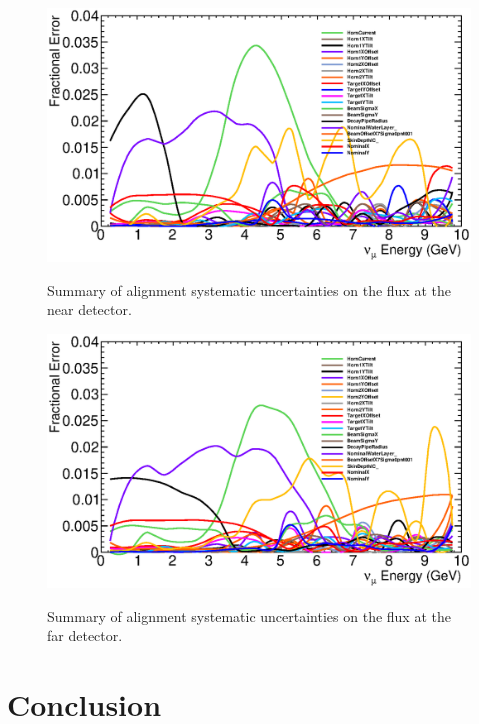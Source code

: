 \begin{figure}[ht]
  \begin{center}
    {\includegraphics[width=6.0in]{figures/error_summary_near.eps}}
  \end{center}
\caption{ Summary of alignment systematic uncertainties on the flux at the near detector.}
\end{figure}

\begin{figure}[ht]
  \begin{center}
    {\includegraphics[width=6.0in]{figures/error_summary_far.eps}}
  \end{center}
\caption{ Summary of alignment systematic uncertainties on the flux at the far detector.}
\end{figure}


\section{Conclusion}

\appendix
